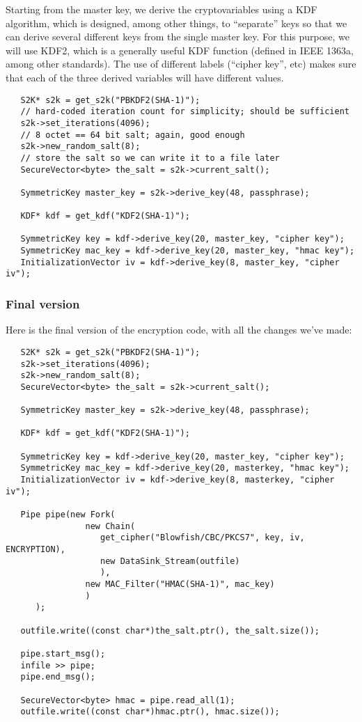 \documentclass{article}
\begin{document}
Starting from the master key, we derive the cryptovariables using a KDF
algorithm, which is designed, among other things, to ``separate'' keys so that
we can derive several different keys from the single master key. For this
purpose, we will use KDF2, which is a generally useful KDF function (defined in
IEEE 1363a, among other standards). The use of different labels (``cipher
key'', etc) makes sure that each of the three derived variables will have
different values.

\begin{verbatim}
   S2K* s2k = get_s2k("PBKDF2(SHA-1)");
   // hard-coded iteration count for simplicity; should be sufficient
   s2k->set_iterations(4096);
   // 8 octet == 64 bit salt; again, good enough
   s2k->new_random_salt(8);
   // store the salt so we can write it to a file later
   SecureVector<byte> the_salt = s2k->current_salt();

   SymmetricKey master_key = s2k->derive_key(48, passphrase);

   KDF* kdf = get_kdf("KDF2(SHA-1)");

   SymmetricKey key = kdf->derive_key(20, master_key, "cipher key");
   SymmetricKey mac_key = kdf->derive_key(20, master_key, "hmac key");
   InitializationVector iv = kdf->derive_key(8, master_key, "cipher iv");
\end{verbatim}

\subsubsection{Final version}

Here is the final version of the encryption code, with all the changes we've
made:

\begin{verbatim}
   S2K* s2k = get_s2k("PBKDF2(SHA-1)");
   s2k->set_iterations(4096);
   s2k->new_random_salt(8);
   SecureVector<byte> the_salt = s2k->current_salt();

   SymmetricKey master_key = s2k->derive_key(48, passphrase);

   KDF* kdf = get_kdf("KDF2(SHA-1)");

   SymmetricKey key = kdf->derive_key(20, master_key, "cipher key");
   SymmetricKey mac_key = kdf->derive_key(20, masterkey, "hmac key");
   InitializationVector iv = kdf->derive_key(8, masterkey, "cipher iv");

   Pipe pipe(new Fork(
                new Chain(
                   get_cipher("Blowfish/CBC/PKCS7", key, iv, ENCRYPTION),
                   new DataSink_Stream(outfile)
                   ),
                new MAC_Filter("HMAC(SHA-1)", mac_key)
                )
      );

   outfile.write((const char*)the_salt.ptr(), the_salt.size());

   pipe.start_msg();
   infile >> pipe;
   pipe.end_msg();

   SecureVector<byte> hmac = pipe.read_all(1);
   outfile.write((const char*)hmac.ptr(), hmac.size());
\end{verbatim}
\end{document}
